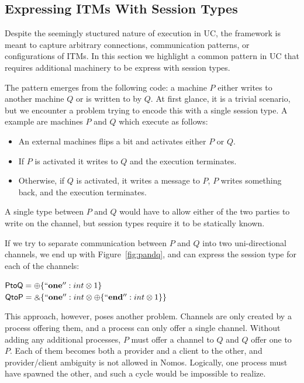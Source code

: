 \subsection{Expressing ITMs With Session Types}
Despite the seemingly stuctured nature of execution in UC, the framework is meant to capture arbitrary connections, communication patterns, or configurations of ITMs. 
In this section we highlight a common pattern in UC that requires additional machinery to be express with session types.

The pattern emerges from the following code: a machine $P$ either writes to another machine $Q$ or is written to by $Q$. 
At first glance, it is a trivial scenario, but we encounter a problem trying to encode this with a single session type.
A example are machines $P$ and $Q$ which execute as follows:
\begin{itemize}
	\item An external machines flips a bit and activates either $P$ or $Q$.
	\item If $P$ is activated it writes to $Q$ and the execution terminates. 
	\item Otherwise, if $Q$ is activated, it writes a message to $P$, $P$ writes something back, and the execution terminates.
\end{itemize}
A single type between $P$ and $Q$ would have to allow either of the two parties to write on the channel, but session types require it to be statically known.

If we try to separate communication between $P$ and $Q$ into two uni-directional channels, we end up with Figure~\ref{fig:pandq}, and can express the session type for each of the channels:
\begin{center}
\parbox{0cm}{
\begin{tabbing}
$\mathsf{PtoQ} = \oplus \{ \mathbf{``one''}: int \otimes 1 \}$ \\
$\mathsf{QtoP} = \mathbin{\binampersand} \{ \mathbf{``one''}: int \otimes \oplus \{ \mathbf{``end''}: int \otimes 1 \} \}$
\end{tabbing}}
\end{center}

This approach, however, poses another problem. 
Channels are only created by a process offering them, and a process can only offer a single channel.
Without adding any additional processes, $P$ must offer a channel to $Q$ and $Q$ offer one to $P$. 
Each of them becomes both a provider and a client to the other, and provider/client ambiguity is not allowed in Nomos. 
Logically, one process must have spawned the other, and such a cycle would be impossible to realize.

